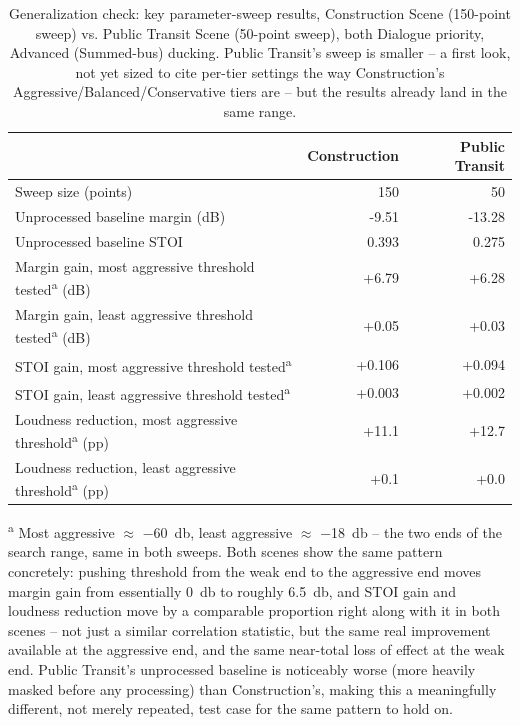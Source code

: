 \begin{table}[h]
\centering
\footnotesize
\caption{Generalization check: key parameter-sweep results, Construction
Scene (150-point sweep) vs. Public Transit Scene (50-point sweep), both
Dialogue priority, Advanced (Summed-bus) ducking. Public Transit's sweep
is smaller -- a first look, not yet sized to cite per-tier settings the
way Construction's Aggressive/Balanced/Conservative tiers are -- but the
results already land in the same range.}
\label{tab:scene-generalization}
\begin{tabular}{@{}l r r@{}}
\toprule
 & \textbf{Construction} & \textbf{Public Transit} \\
\midrule
Sweep size (points) & 150 & 50 \\
Unprocessed baseline margin (dB) & -9.51 & -13.28 \\
Unprocessed baseline STOI & 0.393 & 0.275 \\
Margin gain, most aggressive threshold tested\textsuperscript{a} (dB) & +6.79 & +6.28 \\
Margin gain, least aggressive threshold tested\textsuperscript{a} (dB) & +0.05 & +0.03 \\
STOI gain, most aggressive threshold tested\textsuperscript{a} & +0.106 & +0.094 \\
STOI gain, least aggressive threshold tested\textsuperscript{a} & +0.003 & +0.002 \\
Loudness reduction, most aggressive threshold\textsuperscript{a} (pp) & +11.1 & +12.7 \\
Loudness reduction, least aggressive threshold\textsuperscript{a} (pp) & +0.1 & +0.0 \\
\bottomrule
\end{tabular}
\par\vspace{4pt}
\raggedright\footnotesize\textsuperscript{a} Most aggressive $\approx$
\SI{-60}{\decibel}, least aggressive $\approx$ \SI{-18}{\decibel} -- the
two ends of the search range, same in both sweeps. Both scenes show the
same pattern concretely: pushing threshold from the weak end to the
aggressive end moves margin gain from essentially \SI{0}{\decibel} to
roughly \SI{+6.5}{\decibel}, and STOI gain and loudness reduction move by
a comparable proportion right along with it in both scenes -- not just a
similar correlation statistic, but the same real improvement available at
the aggressive end, and the same near-total loss of effect at the weak
end. Public Transit's unprocessed baseline is noticeably worse (more
heavily masked before any processing) than Construction's, making this a
meaningfully different, not merely repeated, test case for the same
pattern to hold on.
\end{table}

